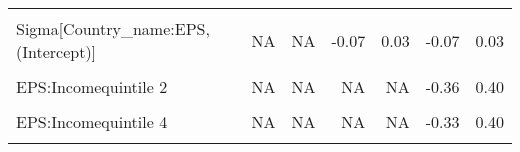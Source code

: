 \begin{table}
\begin{tabular}[t]{lrrrrrr}
\cellcolor{gray!10}{b[EPS Country\_name:US]} & \cellcolor{gray!10}{NA} & \cellcolor{gray!10}{NA} & \cellcolor{gray!10}{-0.10} & \cellcolor{gray!10}{0.39} & \cellcolor{gray!10}{-0.11} & \cellcolor{gray!10}{0.39}\\
Sigma[Country\_name:EPS,(Intercept)] & NA & NA & -0.07 & 0.03 & -0.07 & 0.03\\
\cellcolor{gray!10}{Sigma[Country\_name:EPS,EPS]} & \cellcolor{gray!10}{NA} & \cellcolor{gray!10}{NA} & \cellcolor{gray!10}{0.00} & \cellcolor{gray!10}{0.14} & \cellcolor{gray!10}{0.00} & \cellcolor{gray!10}{0.13}\\
EPS:Incomequintile 2 & NA & NA & NA & NA & -0.36 & 0.40\\
\cellcolor{gray!10}{EPS:Incomequintile 3} & \cellcolor{gray!10}{NA} & \cellcolor{gray!10}{NA} & \cellcolor{gray!10}{NA} & \cellcolor{gray!10}{NA} & \cellcolor{gray!10}{-0.43} & \cellcolor{gray!10}{0.30}\\
EPS:Incomequintile 4 & NA & NA & NA & NA & -0.33 & 0.40\\
\cellcolor{gray!10}{EPS:Incomequintile 5} & \cellcolor{gray!10}{NA} & \cellcolor{gray!10}{NA} & \cellcolor{gray!10}{NA} & \cellcolor{gray!10}{NA} & \cellcolor{gray!10}{-0.55} & \cellcolor{gray!10}{0.13}\\
\bottomrule
\end{tabular}
\end{table}
